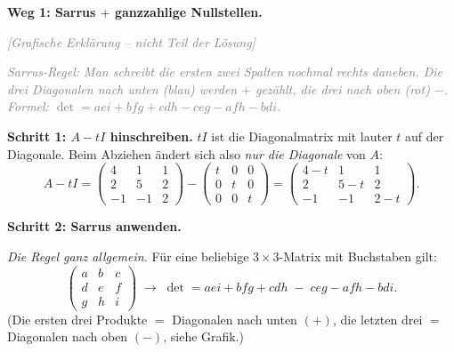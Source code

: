 \documentclass[a4paper,12pt]{article}
\newcommand{\grafik}{\textcolor{gray}{\small\textit{[Grafische Erkl\"arung -- nicht Teil der L\"osung]}}}
\begin{document}
\textbf{Weg 1: Sarrus $+$ ganzzahlige Nullstellen.}

\grafik

\begin{center}
\end{center}

\textcolor{gray}{\small\textit{Sarrus-Regel: Man schreibt die ersten zwei Spalten nochmal rechts daneben. Die drei Diagonalen \emph{nach unten} (blau) werden $+$ gez\"ahlt, die drei \emph{nach oben} (rot) $-$. Formel: $\det = aei + bfg + cdh - ceg - afh - bdi$.}}

\textbf{Schritt 1: $A - tI$ hinschreiben.} $tI$ ist die Diagonalmatrix mit lauter $t$ auf der Diagonale. Beim Abziehen \"andert sich also \emph{nur die Diagonale} von $A$:
\[
A - tI = \begin{pmatrix} 4 & 1 & 1 \\ 2 & 5 & 2 \\ -1 & -1 & 2 \end{pmatrix} - \begin{pmatrix} t & 0 & 0 \\ 0 & t & 0 \\ 0 & 0 & t \end{pmatrix} = \begin{pmatrix} 4-t & 1 & 1 \\ 2 & 5-t & 2 \\ -1 & -1 & 2-t \end{pmatrix}.
\]

\textbf{Schritt 2: Sarrus anwenden.}

\emph{Die Regel ganz allgemein.} F\"ur eine beliebige $3\times3$-Matrix mit Buchstaben gilt:
\[
\begin{pmatrix} a & b & c \\ d & e & f \\ g & h & i \end{pmatrix}
\;\longrightarrow\;
\det = aei + bfg + cdh \;-\; ceg - afh - bdi.
\]
(Die ersten drei Produkte $=$ Diagonalen nach unten $(+)$, die letzten drei $=$ Diagonalen nach oben $(-)$, siehe Grafik.)
\end{document}
